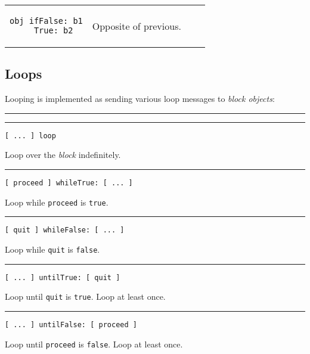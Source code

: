 \documentclass[10pt]{article}
\begin{document}
\begin{multicols*}{3}
{\begin{tabular}{ p{70pt} p{140pt} l l }
\begin{lstlisting}
obj ifFalse: b1
     True: b2
\end{lstlisting}
&\vspace*{0.4cm}
Opposite of previous. 
\\ %
\end{tabular}}




\subsection{Loops}
Looping is implemented as sending various loop messages to \textit{block objects}:

\vspace*{0.2cm}
\hrule
\vspace*{0.03cm}
\hrule

\begin{lstlisting}
[ ... ] loop
\end{lstlisting}
Loop over the \textit{block} indefinitely.

\vspace*{0.2cm}
\hrule

\begin{lstlisting}
[ proceed ] whileTrue: [ ... ]
\end{lstlisting}
Loop while \texttt{proceed} is \texttt{true}.

\vspace*{0.2cm}
\hrule

\begin{lstlisting}
[ quit ] whileFalse: [ ... ]
\end{lstlisting}
Loop while \texttt{quit} is \texttt{false}.

\vspace*{0.2cm}
\hrule

\begin{lstlisting}
[ ... ] untilTrue: [ quit ]
\end{lstlisting}
Loop until \texttt{quit} is \texttt{true}. Loop at least once.

\vspace*{0.2cm}
\hrule

\begin{lstlisting}
[ ... ] untilFalse: [ proceed ]
\end{lstlisting}
Loop until \texttt{proceed} is \texttt{false}. Loop at least once.


\end{multicols*}
\end{document}
